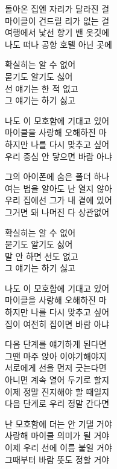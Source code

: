 \begin{lyrics}
\begin{korean}
돌아온 집엔 자리가 달라진 걸\\
마이클이 건드릴 리가 없는 걸\\
여행에서 낯선 향기 밴 옷깃에\\
나도 떠나 공항 호텔 아닌 곳에
\end{korean}

\begin{korean}
확실히는 알 수 없어\\
묻기도 알기도 싫어\\
선 얘기는 한 적 없고\\
그 얘기는 하기 싫고
\end{korean}

\begin{korean}
나도 이 모호함에 기대고 있어\\
마이클을 사랑해 오해하진 마\\
하지만 나를 다시 맞추고 싶어\\
우리 중심 안 닿으면 바람 아냐
\end{korean}

\begin{korean}
그의 아이폰에 숨은 폴더 하나\\
여는 법을 알아도 난 열지 않아\\
우리 집에선 그가 내 곁에 있어\\
그거면 돼 나머진 다 상관없어
\end{korean}

\begin{korean}
확실히는 알 수 없어\\
묻기도 알기도 싫어\\
말 안 하면 선도 없고\\
그 얘기는 하기 싫고
\end{korean}

\begin{korean}
나도 이 모호함에 기대고 있어\\
마이클을 사랑해 오해하진 마\\
하지만 나를 다시 맞추고 싶어\\
집이 여전히 집이면 바람 아냐
\end{korean}

\begin{korean}
다음 단계를 얘기하게 된다면\\
그땐 마주 앉아 이야기해야지\\
서로에게 선을 먼저 긋는다면\\
아니면 계속 열어 두기로 할지\\
이제 정말 진지해야 할 때일지\\
다음 단계로 우리 정말 간다면
\end{korean}

\begin{korean}
난 모호함에 더는 안 기댈 거야\\
사랑해 마이클 의미가 될 거야\\
이제 우리 선에 이름 붙일 거야\\
그때부터 바람 뜻도 정할 거야
\end{korean}
\end{lyrics}

